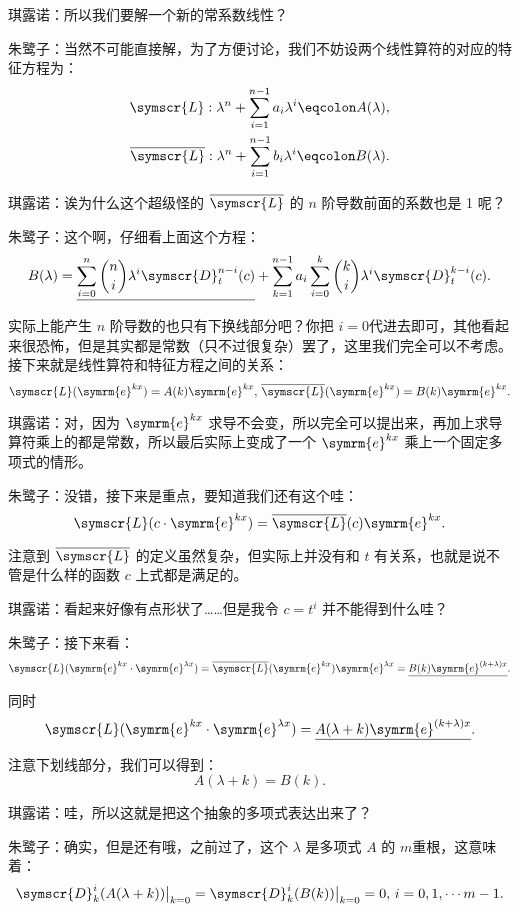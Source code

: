 琪露诺：所以我们要解一个新的常系数线性？

朱鹭子：当然不可能直接解，为了方便讨论，我们不妨设两个线性算符的对应的特征方程为：
\[
	\begin{aligned}
		\symscr{L} : \lambda ^n +\sum_{i=1}^{n-1} a_i \lambda ^i\eqcolon A(\lambda ), \\
		\overline{\symscr{L}} : \lambda ^n +\sum_{i=1}^{n-1} b_i \lambda ^i\eqcolon B(\lambda ).
	\end{aligned}
\]

琪露诺：诶为什么这个超级怪的 \( \overline{\symscr{L} }\) 的 \(n\) 阶导数前面的系数也是 1 呢？

朱鹭子：这个啊，仔细看上面这个方程：
\[
	B(\lambda )=\underline{\sum_{i=0}^{n} \binom{n}{i}\lambda ^i\symscr{D} ^{n-i}_t(c)}+ \sum_{k=1}^{n-1} a_i\sum_{i=0}^{k} \binom{k}{i}\lambda ^i\symscr{D} ^{k-i}_t(c)
	.\]

实际上能产生 \(n\) 阶导数的也只有下换线部分吧？你把 \(i=0\)代进去即可，其他看起来很恐怖，但是其实都是常数（只不过很复杂）罢了，这里我们完全可以不考虑。接下来就是线性算符和特征方程之间的关系：
\[
	\symscr{L} (\symrm{e} ^{kx})=A(k)\symrm{e} ^{kx},\,\overline{\symscr{L}} (\symrm{e} ^{kx})=B(k)\symrm{e} ^{kx}
	.\]

琪露诺：对，因为 \(\symrm{e} ^{kx}\) 求导不会变，所以完全可以提出来，再加上求导算符乘上的都是常数，所以最后实际上变成了一个 \(\symrm{e} ^{kx}\) 乘上一个固定多项式的情形。

朱鹭子：没错，接下来是重点，要知道我们还有这个哇：
\[
	\symscr{L} (c \cdot \symrm{e} ^{kx})=\overline{\symscr{L} }(c)\symrm{e} ^{kx}
	.\]

注意到 \(\overline{\symscr{L} }\) 的定义虽然复杂，但实际上并没有和 \(t\) 有关系，也就是说不管是什么样的函数 \(c\) 上式都是满足的。

琪露诺：看起来好像有点形状了……但是我令 \(c=t^i\) 并不能得到什么哇？

朱鹭子：接下来看：
\[
	\symscr{L} ( \symrm{e} ^{k x}\cdot \symrm{e} ^{\lambda x})=\overline{\symscr{L} }(\symrm{e} ^{k x})\symrm{e} ^{\lambda x}=\underline{B(k)\symrm{e} ^{(k+\lambda )x}}
	.\]

同时
\[
	\symscr{L} ( \symrm{e} ^{k x}\cdot \symrm{e} ^{\lambda x}) =\underline{ A(\lambda +k)\symrm{e} ^{(k+\lambda )x}}
	.\]

注意下划线部分，我们可以得到：
\[
	A(\lambda +k)=B(k)
	.\]

琪露诺：哇，所以这就是把这个抽象的多项式表达出来了？

朱鹭子：确实，但是还有哦，之前过了，这个 \(\lambda \) 是多项式 \(A\) 的 \(m\)重根，这意味着：
\[
	\symscr{D} _k^i(A(\lambda +k))\bigr|_{k=0} =\symscr{D} _k^i(B(k))\bigr|_{k=0}=0,\,i=0,1,\cdots m-1
	.\]

